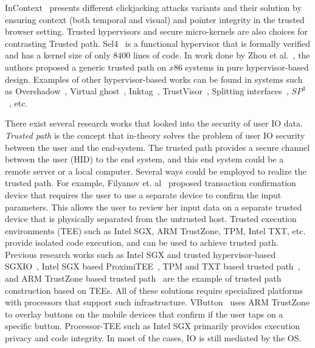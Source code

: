 InContext~\cite{huang2012clickjacking} presents different clickjacking attacks variants and their solution by ensuring context (both temporal and visual) and pointer integrity in the trusted browser setting. Trusted hypervisors and secure micro-kernels are also choices for contrasting Trusted path. Sel4~\cite{klein2009sel4} is a functional hypervisor that is formally verified and has a kernel size of only $8400$ lines of code. In work done by Zhou et al.~\cite{zhou2012building}, the authors proposed a generic trusted path on $x86$ systems in pure hypervisor-based design. Examples of other hypervisor-based works can be found in systems such as Overshadow~\cite{Overshadow}, Virtual ghost~\cite{criswell2014virtual}, Inktag~\cite{hofmann2013inktag}, TrustVisor~\cite{mccune2010trustvisor}, Splitting interfaces~\cite{ta2006splitting}, $SP^3$~\cite{yang2008using}, etc.



There exist several research works that looked into the security of user IO data. \emph{Trusted path} is the concept that in-theory solves the problem of user IO security between the user and the end-system. The trusted path provides a secure channel between the user (HID) to the end system, and this end system could be a remote server or a local computer. Several ways could be employed to realize the trusted path. For example, Filyanov et. al~\cite{filyanov2011uni} proposed transaction confirmation device that requires the user to use a separate device to confirm the input parameters. This allows the user to review her input data on a separate trusted device that is physically separated from the untrusted host. Trusted execution environments (TEE) such as Intel SGX, ARM TrustZone, TPM, Intel TXT, etc. provide isolated code execution, and can be used to achieve trusted path. Previous research works such as Intel SGX and trusted hypervisor-based SGXIO~\cite{weiser2017sgxio}, Intel SGX based ProximiTEE~\cite{dhar2018proximitee}, TPM and TXT based trusted path~\cite{filyanov2011uni}, and ARM TrustZone based trusted path~\cite{filyanov2011uni,sun2015trustotp} are the example of trusted path construction based on TEEs. All of these solutions require specialized platforms with processors that support such infrastructure. VButton~\cite{li2018vbutton} uses ARM TrustZone to overlay buttons on the mobile devices that confirm if the user taps on a specific button. Processor-TEE such as Intel SGX primarily provides execution privacy and code integrity. In most of the cases, IO is still mediated by the OS. 


